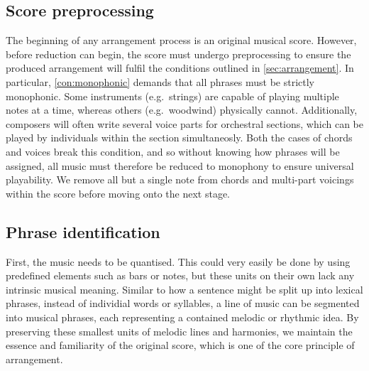 \documentclass[12pt]{article}
\theoremstyle{definition}
\begin{document}
\subsection{Score preprocessing}

The beginning of any arrangement process is an original musical score. However, before reduction can begin, the score must undergo preprocessing to ensure the produced arrangement will fulfil the conditions outlined in \cref{sec:arrangement}. In particular, \cref{con:monophonic} demands that all phrases must be strictly monophonic. Some instruments (e.g.\ strings) are capable of playing multiple notes at a time, whereas others (e.g.\ woodwind) physically cannot. Additionally, composers will often write several voice parts for orchestral sections, which can be played by individuals within the section simultaneosly. Both the cases of chords and voices break this condition, and so without knowing how phrases will be assigned, all music must therefore be reduced to monophony to ensure universal playability. We remove all but a single note from chords and multi-part voicings within the score before moving onto the next stage.


\subsection{Phrase identification}

First, the music needs to be quantised. This could very easily be done by using predefined elements such as bars or notes, but these units on their own lack any intrinsic musical meaning. Similar to how a sentence might be split up into lexical phrases, instead of individial words or syllables, a line of music can be segmented into musical phrases, each representing a contained melodic or rhythmic idea. By preserving these smallest units of melodic lines and harmonies, we maintain the essence and familiarity of the original score, which is one of the core principle of arrangement.
\end{document}
